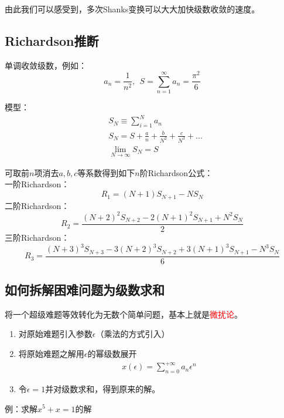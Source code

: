 由此我们可以感受到，多次Shanks变换可以大大加快级数收敛的速度。

\subsection{Richardson推断}
\label{re}

单调收敛级数，例如：
\[a_n=\frac{1}{n^2},\ \ S=\sum_{n=1}^{\infty}a_n=\frac{\pi^2}{6}\]

模型：
\begin{align}
&S_N \equiv \sum_{i=1}^{N}a_n\\
&S_N = S+\frac{a}{n}+\frac{b}{N^2}+\frac{c}{N^3}+...\\
&\lim\limits_{N \rightarrow \infty}S_N = S
\end{align}

可取前$n$项消去$a,b,c$等系数得到如下$n$阶Richardson公式：\\
一阶Richardson：
\begin{equation}
R_1 = (N+1) S_{N+1} - N S_N
\end{equation}
二阶Richardson：
\begin{equation}
R_2 = \frac{(N+2)^2 S_{N+2} - 2(N+1)^2 S_{N+1} + N^2 S_N}{2}
\end{equation}
三阶Richardson：
\begin{equation}
R_3 = \frac{(N+3)^3 S_{N+3} - 3(N+2)^3 S_{N+2} + 3(N+1)^3 S_{N+1} - N^3 S_N}{6}
\end{equation}

\subsection{如何拆解困难问题为级数求和}

将一个超级难题等效转化为无数个简单问题，基本上就是\textcolor{red}{微扰论}。

\begin{enumerate}[fullwidth,itemindent=2em]
	\item
		对原始难题引入参数$\epsilon$（乘法的方式引入）
	\item
		将原始难题之解用$\epsilon$的幂级数展开
		\begin{align}
			x(\epsilon)=\sum_{n=0}^{+\infty}a_n \epsilon ^n
		\end{align}
	\item
		令$\epsilon = 1$并对级数求和，得到原来的解。
\end{enumerate}

例：求解$x^5+x=1$的解

